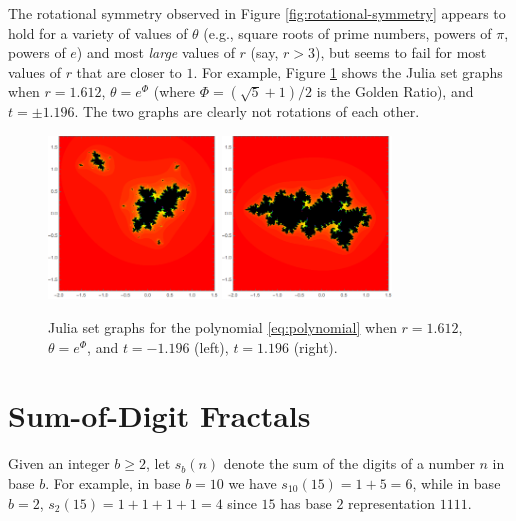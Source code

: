 \documentclass[11pt,leqno]{article}
\begin{document}
The rotational symmetry observed in Figure \ref{fig:rotational-symmetry} 
appears to hold for a variety of values of $\theta$ (e.g., square roots of prime numbers, powers of $\pi$, powers of $e$) and most \emph{large} values of $r$ (say, $r>3$),
but seems to fail for most values of $r$ that are closer to $1$. For example, 
Figure \ref{fig:rotational-symmetry-fail} shows the Julia set graphs
when $r=1.612$, $\theta=e^\Phi$ (where $\Phi=(\sqrt{5}+1)/2$ 
is the Golden Ratio), and $t=\pm 1.196$. The two graphs are clearly not
rotations of each other. 
\begin{figure}[H]
\label{fig:rotational-symmetry-fail}
\centering
\includegraphics[width=0.4\textwidth]{pi2pi1.png}
\hspace{1em}
\includegraphics[width=0.4\textwidth]{pi2pi2.png}
\caption{Julia set graphs for the polynomial \eqref{eq:polynomial}
when $r=1.612$, $\theta=e^\Phi$, and $t=-1.196$ (left), $t=1.196$ (right).
}
\end{figure}




\section{Sum-of-Digit Fractals}

Given an integer $b\ge 2$, let  $s_{b}(n)$ denote the sum of the digits
of a number $n$ in base $b$.  For example, in base $b=10$ we have
$s_{10}(15) = 1 + 5 = 6$, while in base $b=2$, $s_{2}(15) =  1 + 1 + 1+
1 = 4$ since $15$ has base $2$ representation $1111$.
\end{document}
